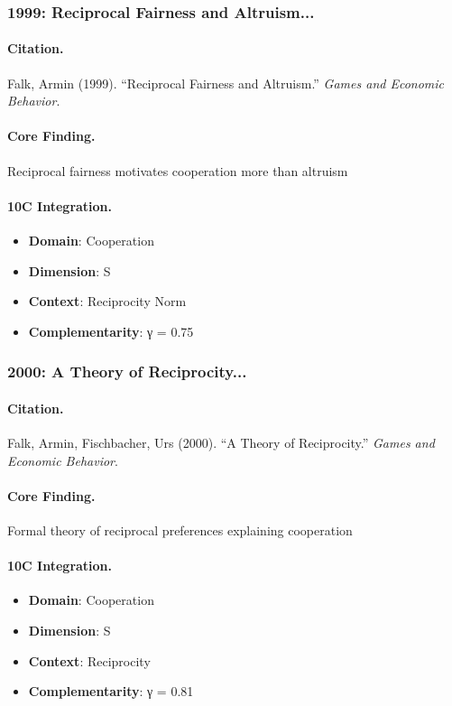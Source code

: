 \subsubsection{1999: Reciprocal Fairness and Altruism...}

\paragraph{Citation.}
Falk, Armin (1999). ``Reciprocal Fairness and Altruism.''
\textit{Games and Economic Behavior}.

\paragraph{Core Finding.}
Reciprocal fairness motivates cooperation more than altruism

\paragraph{10C Integration.}
\begin{itemize}[nosep]
  \item \textbf{Domain}: Cooperation
  \item \textbf{Dimension}: S
  \item \textbf{Context}: Reciprocity Norm
  \item \textbf{Complementarity}: γ = 0.75
\end{itemize}


\subsubsection{2000: A Theory of Reciprocity...}

\paragraph{Citation.}
Falk, Armin, Fischbacher, Urs (2000). ``A Theory of Reciprocity.''
\textit{Games and Economic Behavior}.

\paragraph{Core Finding.}
Formal theory of reciprocal preferences explaining cooperation

\paragraph{10C Integration.}
\begin{itemize}[nosep]
  \item \textbf{Domain}: Cooperation
  \item \textbf{Dimension}: S
  \item \textbf{Context}: Reciprocity
  \item \textbf{Complementarity}: γ = 0.81
\end{itemize}


